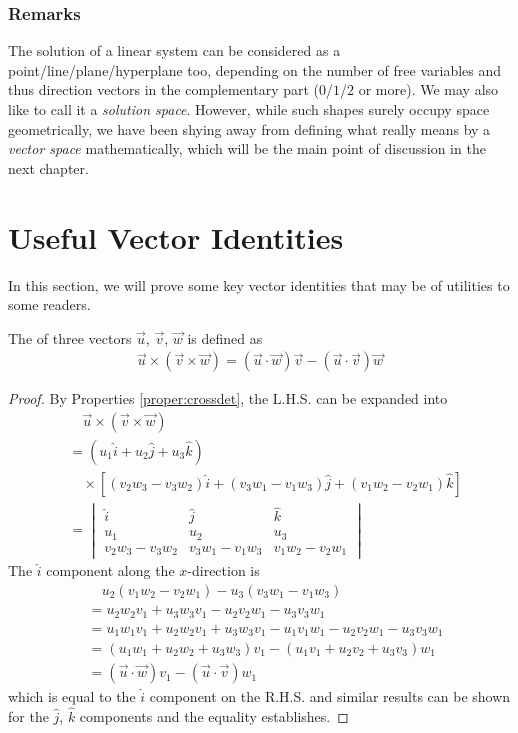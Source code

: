 \subsubsection{Remarks}
The solution of a linear system can be considered as a point/line/plane/hyperplane too, depending on the number of free variables and thus direction vectors in the complementary part ($0$/$1$/$2$ or more). We may also like to call it a \textit{solution space}. However, while such shapes surely occupy space geometrically, we have been shying away from defining what really means by a \textit{vector space} mathematically, which will be the main point of discussion in the next chapter.

\section{Useful Vector Identities}
In this section, we will prove some key vector identities that may be of utilities to some readers.
\begin{proper}
\label{proper:triplecross}
The  of three vectors $\vec{u}$, $\vec{v}$, $\vec{w}$ is defined as
\begin{align*}
\vec{u} \times (\vec{v} \times \vec{w}) = (\vec{u} \cdot \vec{w})\vec{v} - (\vec{u} \cdot \vec{v})\vec{w}
\end{align*}
\end{proper}
\begin{proof}
By Properties \ref{proper:crossdet}, the L.H.S. can be expanded into
\begin{align*}
&\quad\vec{u} \times (\vec{v} \times \vec{w}) \\
&= (u_1\hat{i} + u_2\hat{j} + u_3\hat{k}) \\
&\quad \times [(v_2w_3 - v_3w_2)\hat{i} + (v_3w_1 - v_1w_3)\hat{j} + (v_1w_2 - v_2w_1)\hat{k}] \\
&= 
\begin{vmatrix}
\hat{i} & \hat{j} & \hat{k} \\
u_1 & u_2 & u_3 \\
v_2w_3 - v_3w_2 & v_3w_1 - v_1w_3 & v_1w_2 - v_2w_1 
\end{vmatrix}
\end{align*}
The $\hat{i}$ component along the $x$-direction is
\begin{align*}
&\quad u_2(v_1w_2 - v_2w_1) - u_3(v_3w_1 - v_1w_3) \\
&= u_2w_2v_1 + u_3w_3v_1 - u_2v_2w_1 - u_3v_3w_1 \\
&= u_1w_1v_1 + u_2w_2v_1 + u_3w_3v_1 - u_1v_1w_1 - u_2v_2w_1 - u_3v_3w_1 \\
&= (u_1w_1 + u_2w_2 + u_3w_3)v_1 - (u_1v_1 + u_2v_2 + u_3v_3)w_1 \\
&= (\vec{u} \cdot \vec{w})v_1 - (\vec{u} \cdot \vec{v})w_1
\end{align*}
which is equal to the $\hat{i}$ component on the R.H.S. and similar results can be shown for the $\hat{j}$, $\hat{k}$ components and the equality establishes.
\end{proof}

